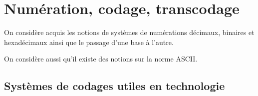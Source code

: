 

\setlength{\columnseprule}{.1pt}

\vspace{2cm}
\pagestyle{fancy}
\thispagestyle{plain}









\section{Numération, codage, transcodage}
\begin{rem}
On considère acquis les notions de systèmes de numérations décimaux, binaires et hexadécimaux ainsi que le passage d'une base à l'autre.

On considère aussi qu'il existe des notions sur la norme ASCII. 
\end{rem}

\subsection{Systèmes de codages utiles en technologie} 


